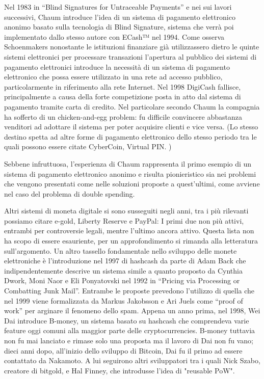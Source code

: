 Nel 1983 in “Blind Signatures for Untraceable Payments” e nei sui lavori successivi, Chaum introduce l’idea di un sistema di pagamento elettronico anonimo basato sulla tecnologia di Blind Signature, sistema che verrà poi implementato dallo stesso autore con ECash™ nel 1994. Come osserva Schoenmakers nonostante le istituzioni finanziare già utilizzassero dietro le quinte sistemi elettronici per processare transazioni l’apertura al pubblico dei sistemi di pagamento elettronici introduce la necessità di un sistema di pagamento elettronico che possa essere utilizzato in una rete ad accesso pubblico, particolarmente in riferimento alla rete Internet. Nel 1998 DigiCash fallisce, principalmente a causa della forte competizione posta in atto dal sistema di pagamento tramite carta di credito. Nel particolare secondo Chaum la compagnia ha sofferto di un chicken-and-egg problem: fu difficile convincere abbastanza venditori  ad adottare il sistema per  poter acquisire clienti e vice versa. (Lo stesso destino spetta ad altre forme di pagamento elettronico dello stesso periodo tra le quali possono essere citate CyberCoin, Virtual PIN. ) 


Sebbene infruttuosa, l’esperienza di Chaum rappresenta il primo esempio di un sistema di pagamento elettronico anonimo e risulta pionieristico sia nei problemi che vengono presentati come nelle soluzioni proposte a quest’ultimi, come avviene nel caso del problema di double spending. 


Altri sistemi di moneta digitale si sono susseguiti negli anni, tra i più rilevanti possiamo citare e-gold, Liberty Reserve e PayPal: I primi due non più attivi, entrambi per controversie legali, mentre l’ultimo ancora attivo. Questa lista non ha scopo di essere esauriente, per un approfondimento si rimanda alla letteratura sull’argomento.
Un altro tassello fondamentale nello sviluppo delle monete elettroniche è l’introduzione nel 1997 di hashcash da parte di Adam Back che indipendentemente descrive un sistema simile a quanto proposto da Cynthia Dwork,  Moni Naor e Eli Ponyatovski nel 1992 in “Pricing via Processing or Combatting Junk Mail”. Entrambe le proposte prevedono l’utilizzo di quella che nel 1999 viene formalizzata da  Markus Jakobsson e Ari Juels come “proof of work” per arginare il fenomeno dello spam. Appena un anno prima, nel 1998, Wei Dai introduce B-money, un sistema basato su hashcash che comprendeva varie feature oggi comuni alla maggior parte delle cryptocurrencies. B-money tuttavia non fu mai lanciato e rimase solo una proposta ma il lavoro di Dai non fu vano; dieci anni dopo, all'inizio dello sviluppo di Bitcoin, Dai fu il primo ad essere contattato da Nakamoto. A lui seguirono altri sviluppatori tra i quali Nick Szabo, creatore di bitgold, e Hal Finney, che introdusse l'idea di "reusable PoW". 

